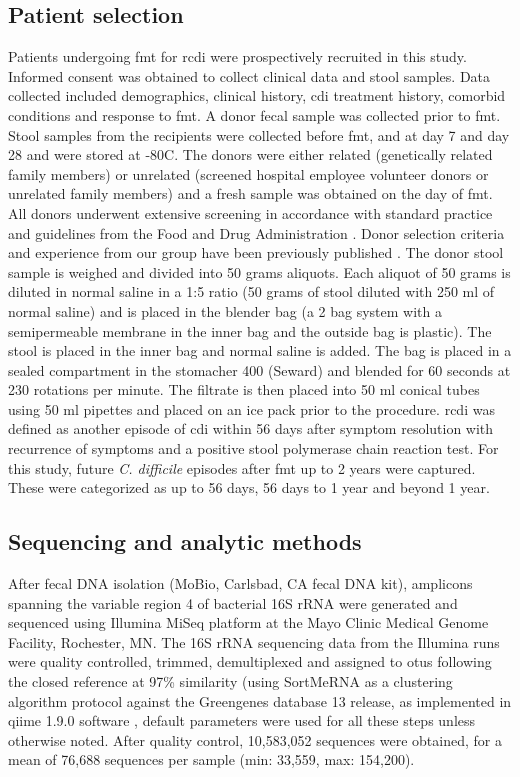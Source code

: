 \subsection{Patient selection}

Patients undergoing \gls{fmt} for \gls{rcdi} were prospectively recruited in 
this study. Informed consent was obtained to collect clinical data and stool 
samples. Data collected included demographics, clinical history, \gls{cdi} 
treatment history, comorbid conditions and response to \gls{fmt}. A donor fecal 
sample was collected prior to \gls{fmt}. Stool samples from the recipients were 
collected before \gls{fmt}, and at day 7 and day 28 and were stored at 
-80\textdegree C. The donors were either related (genetically related family 
members) or unrelated (screened hospital employee volunteer donors or unrelated 
family members) and a fresh sample was obtained on the day of \gls{fmt}. All 
donors underwent extensive screening in accordance with standard practice and 
guidelines from the Food and Drug Administration \cite{RN1446}. Donor selection 
criteria and experience from our group have been previously published 
\cite{RN1523}. The donor stool sample is weighed and divided into 50 grams 
aliquots. Each aliquot of 50 grams is diluted in normal saline in a 1:5 ratio 
(50 grams of stool diluted with 250 ml of normal saline) and is placed in the 
blender bag (a 2 bag system with a semipermeable membrane in the inner bag and 
the outside bag is plastic). The stool is placed in the inner bag and normal 
saline is added. The bag is placed in a sealed compartment in the stomacher 400 
(Seward) and blended for 60 seconds at 230 rotations per minute. The filtrate 
is then placed into 50 ml conical tubes using 50 ml pipettes and placed on an 
ice pack prior to the procedure.  \Gls{rcdi} was defined as another episode of 
\gls{cdi} within 56 days after symptom resolution with recurrence of symptoms 
and a positive stool polymerase chain reaction test. For this study, future 
\textit{C. difficile} episodes after \gls{fmt} up to 2 years were captured.  
These were categorized as up to 56 days, 56 days to 1 year and beyond 1 year. 

\subsection{Sequencing and analytic methods}

After fecal DNA isolation (MoBio, Carlsbad, CA fecal DNA kit), amplicons 
spanning the variable region 4 of bacterial 16S rRNA were generated and 
sequenced using Illumina MiSeq platform at the Mayo Clinic Medical Genome 
Facility, Rochester, MN. The 16S rRNA sequencing data from the Illumina runs 
were quality controlled, trimmed, demultiplexed and assigned to \glspl{otu} 
following the closed reference at 97\% similarity (using SortMeRNA as a 
clustering algorithm \cite{RN3810} protocol against the Greengenes \cite{RN165} 
database 13 release, as implemented in \gls{qiime} 1.9.0 
software \cite{RN110}, default parameters were used for all these steps unless 
otherwise noted. After quality control, 10,583,052 sequences were obtained, for 
a mean of 76,688 sequences per sample (min: 33,559, max: 154,200).


